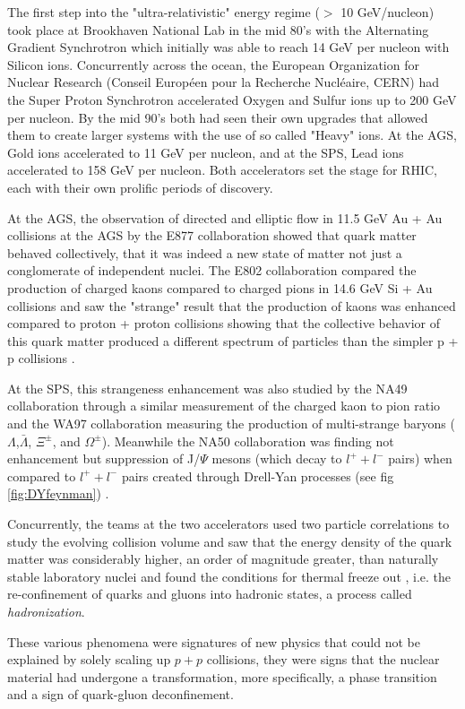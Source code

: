 The first step into the "ultra-relativistic" energy regime ($>$ 10 GeV/nucleon) took place at Brookhaven National Lab in the mid 80's with the Alternating Gradient Synchrotron which initially was able to reach 14 GeV per nucleon with Silicon ions. Concurrently across the ocean, the European Organization for Nuclear Research (Conseil Européen pour la Recherche Nucléaire, CERN) had the Super Proton Synchrotron accelerated Oxygen and Sulfur ions up to 200 GeV per nucleon. By the mid 90's both had seen their own upgrades that allowed them to create larger systems with the use of so called "Heavy" ions. At the AGS, Gold ions accelerated to 11 GeV per nucleon, and at the SPS, Lead ions accelerated to 158 GeV per nucleon\citep{wojciechphenomenology}. Both accelerators set the stage for RHIC, each with their own prolific periods of discovery. 

At the AGS, the observation of directed and elliptic flow in 11.5 GeV Au + Au collisions at the AGS by the E877 collaboration \citep{Barrette:1999rx} showed that quark matter behaved collectively, that it was indeed a new state of matter not just a conglomerate of independent nuclei. The E802 collaboration compared the production of charged kaons compared to charged pions in 14.6 GeV Si + Au collisions and saw the "strange" result that the production of kaons was enhanced compared to proton + proton collisions showing that the collective behavior of this quark matter produced a different spectrum of particles than the simpler p + p collisions \citep{PhysRevLett.64.847}. 

At the SPS, this strangeness enhancement was also studied by the NA49\citep{Hohne:1999jf} collaboration through a similar measurement of the charged kaon to pion ratio and the WA97\citep{Antinori:1999hy} collaboration measuring the production of multi-strange baryons ($\Lambda$,$\bar{\Lambda}$, $\Xi^{\pm}$, and $\Omega^{\pm}$). Meanwhile the NA50 collaboration was finding not enhancement but suppression of J/$\Psi$ mesons (which decay to $l^{+}+l^{-}$ pairs) when compared to $l^{+}+l^{-}$ pairs created through Drell-Yan processes (see fig \ref{fig:DYfeynman}) \citep{Abreu:2000ni}.

Concurrently, the teams at the two accelerators used two particle correlations to study the evolving collision volume and saw that the energy density of the quark matter was considerably higher, an order of magnitude greater, than naturally stable laboratory nuclei \citep{Heinz:1999rw} and found the conditions for thermal freeze out \citep{BraunMunzinger:1998cg}, i.e. the re-confinement of quarks and gluons into hadronic states, a process called \textit{hadronization}.

These various phenomena were signatures of new physics that could not be explained by solely scaling up $p+p$ collisions, they were signs that the nuclear material had undergone a transformation, more specifically, a phase transition and a sign of quark-gluon deconfinement. 
\pagebreak
\pagebreak
